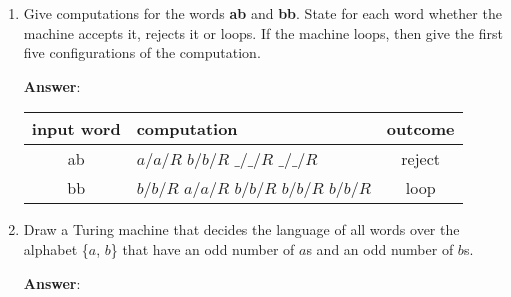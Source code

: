 \documentclass[a4paper, 14pt]{report}
\newcommand{\answer}[1]{%
	\textbf{Answer}:\\
#1}
\begin{document}
\begin{enumerate}[label=(\alph*)]
	\setlength\itemsep{2em}

\item Give computations for the words \textbf{ab} and \textbf{bb}. 
	State for each word whether the machine accepts it, rejects it or loops. 
	If the machine loops, then give the first five configurations of the computation.

	\answer{%
		\begin{center}
			\begin{tabular}{ |c|l|c| } 
				\hline
				input word & computation & outcome \\
				\hline
				ab & $a/a/R$ \hspace{0.1cm} \vdash \hspace{0.2cm} $b/b/R$ \hspace{0.2cm} \vdash \hspace{0.2cm} $\_/\_/R$ \hspace{0.2cm} \vdash \hspace{0.2cm} $\_/\_/R$ & reject \\
				\hline
				bb & $b/b/R$ \hspace{0.2cm} \vdash \hspace{0.2cm} $a/a/R$ \hspace{0.2cm} \vdash \hspace{0.2cm} $b/b/R$ \hspace{0.2cm} \vdash \hspace{0.2cm} $b/b/R$ \hspace{0.2cm} \vdash \hspace{0.2cm} $b/b/R$ & loop \\
				\hline
			\end{tabular}
	\end{center}}

\item Draw a Turing machine that decides the language of all words
	over the alphabet \{$a$, $b$\} that have an odd number of $a$s and
	an odd number of $b$s.

	\answer{}

\end{enumerate}		

\pagebreak
\end{document}
